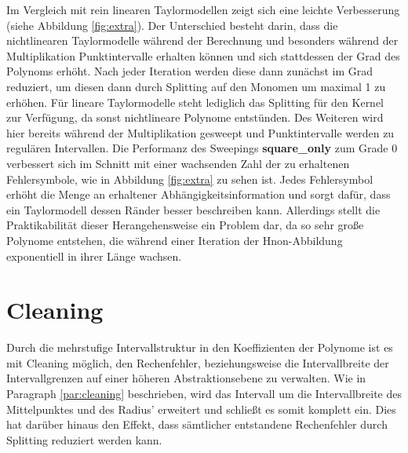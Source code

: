 Im Vergleich mit rein linearen Taylormodellen zeigt sich eine leichte Verbesserung (siehe Abbildung \ref{fig:extra}). Der Unterschied besteht darin, dass die nichtlinearen Taylormodelle während der Berechnung und besonders während der Multiplikation Punktintervalle erhalten können und sich stattdessen der Grad des Polynoms erhöht. Nach jeder Iteration werden diese dann zunächst im Grad reduziert, um diesen dann durch Splitting auf den Monomen um maximal 1 zu erhöhen. Für lineare Taylormodelle steht lediglich das Splitting für den Kernel zur Verfügung, da sonst nichtlineare Polynome entstünden. Des Weiteren wird hier bereits während der Multiplikation gesweept und Punktintervalle werden zu regulären Intervallen. Die Performanz des Sweepings \textbf{square\_only} zum Grade 0 verbessert sich im Schnitt mit einer wachsenden Zahl der zu erhaltenen Fehlersymbole, wie in Abbildung \ref{fig:extra} zu sehen ist. Jedes Fehlersymbol erhöht die Menge an erhaltener Abhängigkeitsinformation und sorgt dafür, dass ein Taylormodell dessen Ränder besser beschreiben kann. Allerdings stellt die Praktikabilität dieser Herangehensweise ein Problem dar, da so sehr große Polynome entstehen, die während einer Iteration der H\e non-Abbildung exponentiell in ihrer Länge wachsen.
 


 \section{Cleaning}
 Durch die mehrstufige Intervallstruktur in den Koeffizienten der Polynome ist es mit Cleaning möglich, den Rechenfehler, beziehungsweise die Intervallbreite der Intervallgrenzen auf einer höheren Abstraktionsebene zu verwalten. Wie in Paragraph \ref{par:cleaning} beschrieben, wird das Intervall um die Intervallbreite des Mittelpunktes und des Radius' erweitert und schließt es somit komplett ein. Dies hat darüber hinaus den Effekt, dass sämtlicher entstandene Rechenfehler durch Splitting reduziert werden kann. 
 
 
